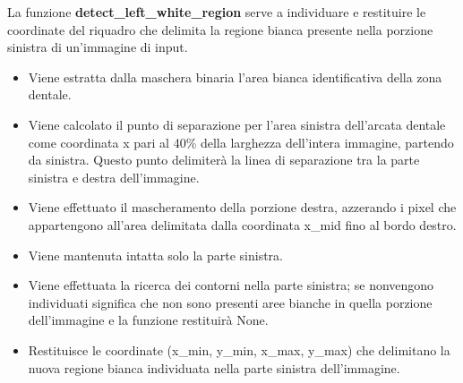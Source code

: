 \documentclass[12pt,a4paper,openright,twoside]{book}
\begin{document}
La funzione \textbf{detect\_left\_white\_region} serve a individuare e restituire le coordinate del riquadro che delimita la regione bianca presente nella porzione sinistra di un'immagine di input.
\begin{itemize}
\item Viene estratta dalla maschera binaria l'area bianca identificativa della zona dentale.
\item Viene calcolato il punto di separazione per l'area sinistra dell'arcata dentale come coordinata x pari al 40\% della larghezza dell'intera immagine, partendo da sinistra. Questo punto delimiterà la linea di separazione tra la parte sinistra e destra dell'immagine.
\item Viene effettuato il mascheramento della porzione destra, azzerando i pixel che appartengono all'area delimitata dalla coordinata x\_mid fino al bordo destro.
\item Viene mantenuta intatta solo la parte sinistra.
\item Viene effettuata la ricerca dei contorni nella parte sinistra; se nonvengono individuati significa che non sono presenti aree bianche in quella porzione dell'immagine e la funzione restituirà None.
\item Restituisce le coordinate (x\_min, y\_min, x\_max, y\_max) che delimitano la nuova regione bianca individuata nella parte sinistra dell’immagine.
\end{itemize}
\end{document}
